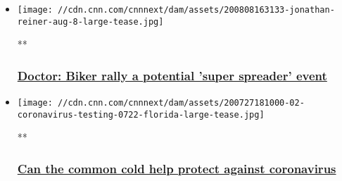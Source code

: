 \begin{itemize}
\item
  \href{/videos/health/2020/08/08/sturgis-south-dakota-coronavirus-reiner-nr-sot-vpx.cnn}{}

  \texttt{[image: //cdn.cnn.com/cnnnext/dam/assets/200808163133-jonathan-reiner-aug-8-large-tease.jpg]}

  **

  \hypertarget{doctor-biker-rally-a-potential-super-spreader-event}{%
  \subsubsection{\texorpdfstring{\href{/videos/health/2020/08/08/sturgis-south-dakota-coronavirus-reiner-nr-sot-vpx.cnn}{Doctor:
  Biker rally a potential 'super spreader'
  event}}{Doctor: Biker rally a potential 'super spreader' event}}\label{doctor-biker-rally-a-potential-super-spreader-event}}
\item
  \href{/videos/health/2020/08/08/coronavirus-cold-virus-resistance-smerconish-sot.cnn}{}

  \texttt{[image: //cdn.cnn.com/cnnnext/dam/assets/200727181000-02-coronavirus-testing-0722-florida-large-tease.jpg]}

  **

  \hypertarget{can-the-common-cold-help-protect-against-coronavirus}{%
  \subsubsection{\texorpdfstring{\href{/videos/health/2020/08/08/coronavirus-cold-virus-resistance-smerconish-sot.cnn}{Can
  the common cold help protect against
  coronavirus}}{Can the common cold help protect against coronavirus}}\label{can-the-common-cold-help-protect-against-coronavirus}}
\end{itemize}

